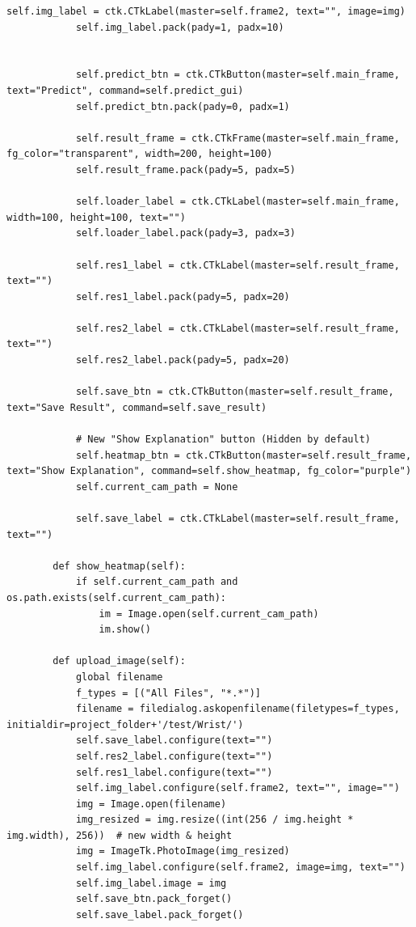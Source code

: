\documentclass[a4paper,12pt]{report}
\begin{document}
\begin{lstlisting}[style=pythonstyle]
            self.img_label = ctk.CTkLabel(master=self.frame2, text="", image=img)
            self.img_label.pack(pady=1, padx=10)


            self.predict_btn = ctk.CTkButton(master=self.main_frame, text="Predict", command=self.predict_gui)
            self.predict_btn.pack(pady=0, padx=1)

            self.result_frame = ctk.CTkFrame(master=self.main_frame, fg_color="transparent", width=200, height=100)
            self.result_frame.pack(pady=5, padx=5)

            self.loader_label = ctk.CTkLabel(master=self.main_frame, width=100, height=100, text="")
            self.loader_label.pack(pady=3, padx=3)

            self.res1_label = ctk.CTkLabel(master=self.result_frame, text="")
            self.res1_label.pack(pady=5, padx=20)

            self.res2_label = ctk.CTkLabel(master=self.result_frame, text="")
            self.res2_label.pack(pady=5, padx=20)

            self.save_btn = ctk.CTkButton(master=self.result_frame, text="Save Result", command=self.save_result)
            
            # New "Show Explanation" button (Hidden by default)
            self.heatmap_btn = ctk.CTkButton(master=self.result_frame, text="Show Explanation", command=self.show_heatmap, fg_color="purple")
            self.current_cam_path = None

            self.save_label = ctk.CTkLabel(master=self.result_frame, text="")

        def show_heatmap(self):
            if self.current_cam_path and os.path.exists(self.current_cam_path):
                im = Image.open(self.current_cam_path)
                im.show()

        def upload_image(self):
            global filename
            f_types = [("All Files", "*.*")]
            filename = filedialog.askopenfilename(filetypes=f_types, initialdir=project_folder+'/test/Wrist/')
            self.save_label.configure(text="")
            self.res2_label.configure(text="")
            self.res1_label.configure(text="")
            self.img_label.configure(self.frame2, text="", image="")
            img = Image.open(filename)
            img_resized = img.resize((int(256 / img.height * img.width), 256))  # new width & height
            img = ImageTk.PhotoImage(img_resized)
            self.img_label.configure(self.frame2, image=img, text="")
            self.img_label.image = img
            self.save_btn.pack_forget()
            self.save_label.pack_forget()


\end{lstlisting}
\end{document}
